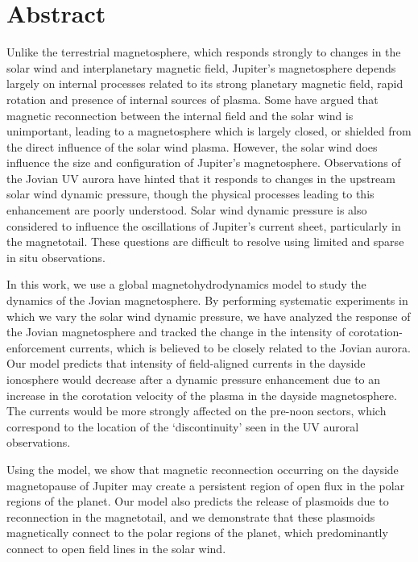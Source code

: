 \chapter{Abstract}

Unlike the terrestrial magnetosphere, which responds strongly to changes in the solar wind and interplanetary magnetic field, Jupiter's magnetosphere depends largely on internal processes related to its strong planetary magnetic field, rapid rotation and presence of internal sources of plasma. Some have argued that magnetic reconnection between the internal field and the solar wind is unimportant, leading to a magnetosphere which is largely closed, or shielded from the direct influence of the solar wind plasma. However, the solar wind does influence the size and configuration of Jupiter's magnetosphere. Observations of the Jovian UV aurora have hinted that it responds to changes in the upstream solar wind dynamic pressure, though the physical processes leading to this enhancement are poorly understood. Solar wind dynamic pressure is also considered to influence the oscillations of Jupiter's current sheet, particularly in the magnetotail. These questions are difficult to resolve using limited and sparse in situ observations. 

In this work, we use a global magnetohydrodynamics model to study the dynamics of the Jovian magnetosphere. By performing systematic experiments in which we vary the solar wind dynamic pressure, we have analyzed the response of the Jovian magnetosphere and tracked the change in the intensity of corotation-enforcement currents, which is believed to be closely related to the Jovian aurora. Our model predicts that intensity of field-aligned currents in the dayside ionosphere would decrease after a dynamic pressure enhancement due to an increase in the corotation velocity of the plasma in the dayside magnetosphere. The currents would be more strongly affected on the pre-noon sectors, which correspond to the location of the ‘discontinuity’ seen in the UV auroral observations. 

Using the model, we show that magnetic reconnection occurring on the dayside magnetopause of Jupiter may create a persistent region of open flux in the polar regions of the planet. Our model also predicts the release of plasmoids due to reconnection in the magnetotail, and we demonstrate that these plasmoids magnetically connect to the polar regions of the planet, which predominantly connect to open field lines in the solar wind. 


